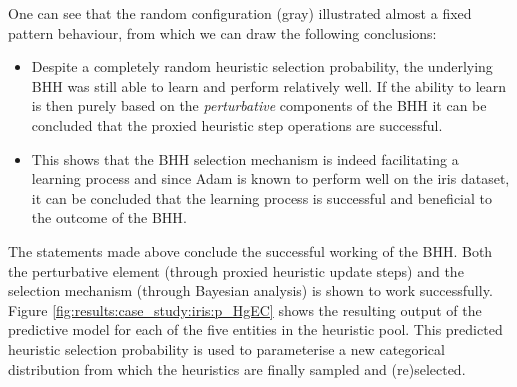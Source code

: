 One can see that the random configuration (gray) illustrated almost a fixed pattern behaviour, from which we can draw the following conclusions:

\begin{itemize}
      \item Despite a completely random heuristic selection probability, the underlying \Acs{BHH} was still able to learn and perform relatively well. If the ability to learn is then purely based on the \textit{perturbative} components of the \Acs{BHH} it can be concluded that the proxied heuristic step operations are successful.

      \item This shows that the \Acs{BHH} selection mechanism is indeed facilitating a learning process and since \Acs{Adam} is known to perform well on the iris dataset, it can be concluded that the learning process is successful and beneficial to the outcome of the \Acs{BHH}.
\end{itemize}

The statements made above conclude the successful working of the \Acs{BHH}. Both the perturbative element (through proxied heuristic update steps) and the selection mechanism (through Bayesian analysis) is shown to work successfully. Figure \ref{fig:results:case_study:iris:p_HgEC} shows the resulting output of the predictive model for each of the five entities in the heuristic pool. This predicted heuristic selection probability is used to parameterise a new categorical distribution from which the heuristics are finally sampled and (re)selected.

